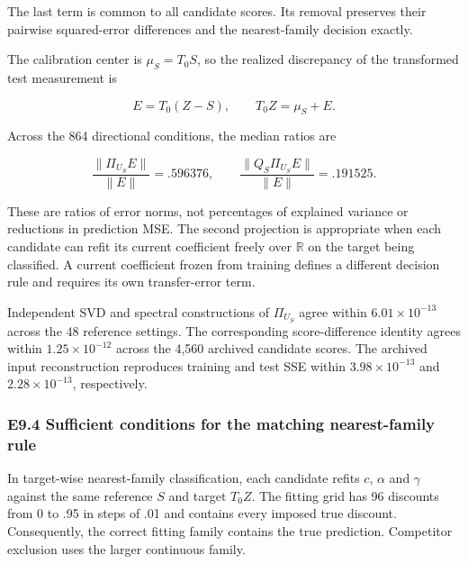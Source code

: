 \documentclass[11pt,a4paper]{article}
\begin{document}
The last term is common to all candidate scores. Its removal preserves
their pairwise squared-error differences and the nearest-family decision
exactly.

\par
\noindent\begin{minipage}{\linewidth}

The calibration center is \(\mu_S=T_0S\), so the realized discrepancy of
the transformed test measurement is

\[
E=T_0(Z-S),\qquad T_0Z=\mu_S+E.
\]

\end{minipage}\par

\par
\noindent\begin{minipage}{\linewidth}

Across the 864 directional conditions, the median ratios are

\[
\frac{\|\Pi_{U_S}E\|}{\|E\|}=.596376,
\qquad
\frac{\|Q_S\Pi_{U_S}E\|}{\|E\|}=.191525.
\]

\end{minipage}\par

These are ratios of error norms, not percentages of explained variance
or reductions in prediction MSE. The second projection is appropriate
when each candidate can refit its current coefficient freely over
\(\mathbb R\) on the target being classified. A current coefficient
frozen from training defines a different decision rule and requires its
own transfer-error term.

Independent SVD and spectral constructions of \(\Pi_{U_S}\) agree within
\(6.01\times10^{-13}\) across the 48 reference settings. The
corresponding score-difference identity agrees within
\(1.25\times10^{-12}\) across the 4,560 archived candidate scores. The
archived input reconstruction reproduces training and test SSE within
\(3.98\times10^{-13}\) and \(2.28\times10^{-13}\), respectively.

\subsubsection{E9.4 Sufficient conditions for the matching
nearest-family
rule}\label{e9.4-sufficient-conditions-for-the-matching-nearest-family-rule}

In target-wise nearest-family classification, each candidate refits
\(c\), \(\alpha\) and \(\gamma\) against the same reference \(S\) and
target \(T_0Z\). The fitting grid has 96 discounts from 0 to .95 in
steps of .01 and contains every imposed true discount. Consequently, the
correct fitting family contains the true prediction. Competitor
exclusion uses the larger continuous family.
\end{document}
